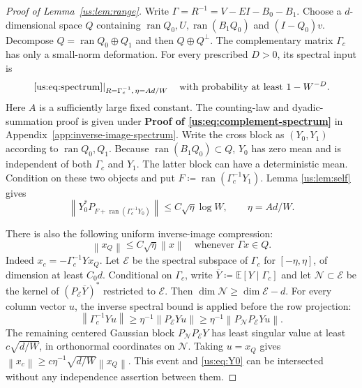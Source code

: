 \documentclass[11pt]{article}
\numberwithin{equation}{section}
\theoremstyle{remark}
\newcommand{\E}{\mathbb E}
\newcommand{\ran}{\operatorname{ran}}
\newcommand{\norm}[1]{\left\|#1\right\|}
\begin{document}
\begin{proof}[Proof of Lemma~\ref{us:lem:range}]
Write $\Gamma=R^{-1}=V-EI-B_0-B_1$.
Choose a $d$-dimensional space $Q$ containing $\ran Q_0,U,\ran(B_1Q_0)$ and
$(I-Q_0)v$. Decompose $Q=\ran Q_0\oplus Q_1$ and then $Q\oplus Q^\perp$.
The complementary matrix $\Gamma_c$ has only a small-norm deformation.
For every prescribed $D>0$, its spectral input is
\begin{equation}\label{us:eq:complement-spectrum}
 \left.\eqref{us:eq:spectrum}\right|_{R=\Gamma_c^{-1},\,\eta=Ad/W}
 \quad\text{with probability at least }1-W^{-D}.
\end{equation}
Here $A$ is a sufficiently large fixed constant. The counting-law and
dyadic-summation proof is given under \textbf{Proof of
\eqref{us:eq:complement-spectrum}} in
Appendix~\ref{app:inverse-image-spectrum}. Write the cross block as
$(Y_0,Y_1)$ according to $\ran Q_0,Q_1$. Because $\ran(B_1Q_0)\subset Q$,
$Y_0$ has zero mean and is independent of both $\Gamma_c$ and $Y_1$.
The latter block can have a deterministic mean. Condition on these two
objects and put $F\coloneqq \ran(\Gamma_c^{-1}Y_1)$. Lemma \ref{us:lem:self} gives
\begin{equation}
 \norm{Y_0^*P_{F+\ran(\Gamma_c^{-1}Y_0)}}
 \le C\sqrt\eta\log W,\qquad \eta=Ad/W.
 \label{us:eq:Y0}
\end{equation}

There is also the following uniform inverse-image compression:
\begin{equation}
 \norm{x_Q}\le C\sqrt\eta\norm x
 \quad\text{whenever }\Gamma x\in Q.
 \label{us:eq:absolute}
\end{equation}
Indeed $x_c=-\Gamma_c^{-1}Yx_Q$. Let $\mathcal E$ be the spectral subspace
of $\Gamma_c$ for $[-\eta,\eta]$, of dimension at least $C_0d$.
Conditional on $\Gamma_c$, write $\overline Y\coloneqq \E[Y\mid\Gamma_c]$ and let
$\mathcal N\subset\mathcal E$ be the kernel of
$(P_{\mathcal E}\overline Y)^*$ restricted to $\mathcal E$.
Then $\dim\mathcal N\ge\dim\mathcal E-d$. For every column vector $u$,
the inverse spectral bound is applied before the row projection:
\[
 \norm{\Gamma_c^{-1}Yu}
 \ge\eta^{-1}\norm{P_{\mathcal E}Yu}
 \ge\eta^{-1}\norm{P_{\mathcal N}P_{\mathcal E}Yu}.
\]
The remaining centered Gaussian block $P_{\mathcal N}P_{\mathcal E}Y$
has least singular value at least $c\sqrt{d/W}$, in orthonormal coordinates
on $\mathcal N$. Taking $u=x_Q$ gives
$\norm{x_c}\ge c\eta^{-1}\sqrt{d/W}\norm{x_Q}$.
This event and \eqref{us:eq:Y0} can be intersected without any independence
assertion between them.


\end{proof}
\end{document}
